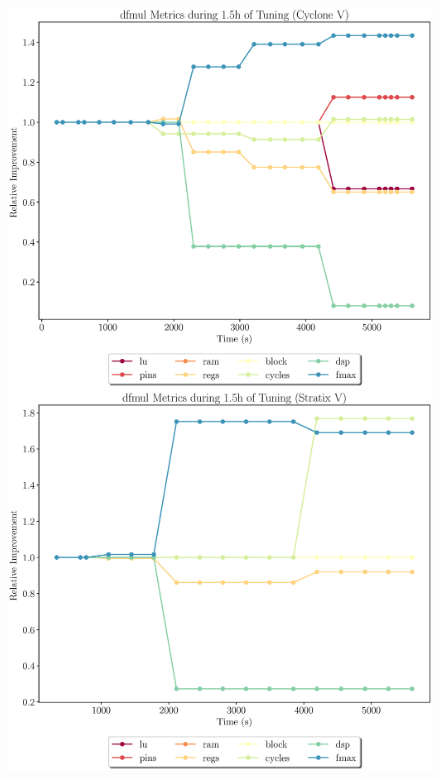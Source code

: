 \documentclass[12pt, a4paper]{article}
\begin{document}
\begin{figure}[htpb]
    \begin{minipage}{.48\textwidth}
        \includegraphics[scale=.29]{dfmul_all_5400_chstone_CycloneV}
    \end{minipage}%
    \hfill
    \begin{minipage}{.48\textwidth}
        \includegraphics[scale=.29]{dfmul_all_5400_chstone_StratixV}
    \end{minipage}%


\end{figure}
\end{document}

